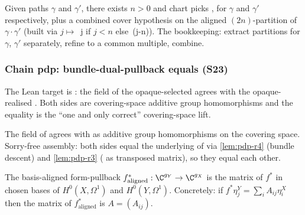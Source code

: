 \begin{lemma}
\label{lem:pcr-phase-6b}
Given paths $\gamma$ and $\gamma'$, there exists $n>0$ and chart
picks ,  for $\gamma$ and $\gamma'$
respectively, plus a combined cover hypothesis on the aligned
$(2n)$-partition of $\gamma\cdot\gamma'$ (built via
$j\mapsto$ \,j if $j<n$ else \,(j-n)).
The bookkeeping: extract partitions for $\gamma$, $\gamma'$
separately, refine to a common multiple, combine.
\leanok
\end{lemma}

\subsubsection*{Chain pdp: bundle-dual-pullback equals  (S23)}

The Lean target is
: the
 field of the opaque-selected
 agrees with the
opaque-realised . Both sides are
covering-space additive group homomorphisms and the equality is the
``one and only correct'' covering-space lift.

\begin{lemma}
\label{lem:pdp-r0}
The  field of 
agrees with  as additive group
homomorphisms on the covering space.  Sorry-free assembly: both sides
equal the underlying  of
 via
\ref{lem:pdp-r4} (bundle descent) and \ref{lem:pdp-r3}
( as transposed matrix), so they equal each
other.
\leanok
\end{lemma}

\begin{lemma}
\label{lem:pdp-r1}
The basis-aligned form-pullback
$f^{*}_{\mathrm{aligned}}:\C^{g_{Y}}\to\C^{g_{X}}$ is the matrix of
$f^{*}$ in chosen bases of $H^{0}(X,\Omega^{1})$ and
$H^{0}(Y,\Omega^{1})$.  Concretely: if
$f^{*}\eta_{j}^{Y}=\sum_{i}A_{ij}\eta_{i}^{X}$ then the matrix of
$f^{*}_{\mathrm{aligned}}$ is $A=(A_{ij})$.
\leanok
\end{lemma}

